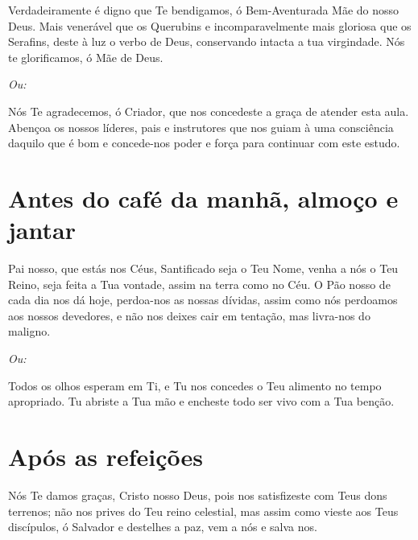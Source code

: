 \documentclass{subfiles}
\begin{document}
Verdadeiramente é digno que Te bendigamos, ó Bem-Aven\-turada Mãe do 
nosso Deus. Mais venerável que os Querubins e incomparavelmente mais 
gloriosa que os Serafins, deste à luz o verbo de Deus, conservando intacta a 
tua virgindade. Nós te glorificamos, ó Mãe de Deus.

\textit{Ou:}

Nós Te agradecemos, ó Criador, que nos concedeste a graça de atender esta aula.
Abençoa os nossos líderes, pais e instrutores que nos guiam à uma consciência
daquilo que é bom e concede-nos poder e força para continuar com este estudo.

\section*{Antes do café da manhã, almoço e jantar}

Pai nosso, que estás nos Céus, Santificado seja o Teu Nome, venha a nós o Teu 
Reino, seja feita a Tua vontade, assim na terra como no Céu. O Pão nosso de 
cada dia nos dá hoje, perdoa-nos as nossas dívidas, assim como nós 
perdoamos aos nossos devedores, e não nos deixes cair em tentação, mas 
livra-nos do maligno. 

\textit{Ou:}

Todos os olhos esperam em Ti, e Tu nos concedes o Teu alimento no tempo 
apropriado. Tu abriste a Tua mão e encheste todo ser vivo com a Tua benção. 

\section*{Após as refeições}

Nós Te damos graças, Cristo nosso Deus, pois nos satisfizeste com Teus dons 
terrenos; não nos prives do Teu reino celestial, mas assim como vieste aos Teus 
discípulos, ó Salvador e destelhes a paz, vem a nós e salva nos.
\end{document}
